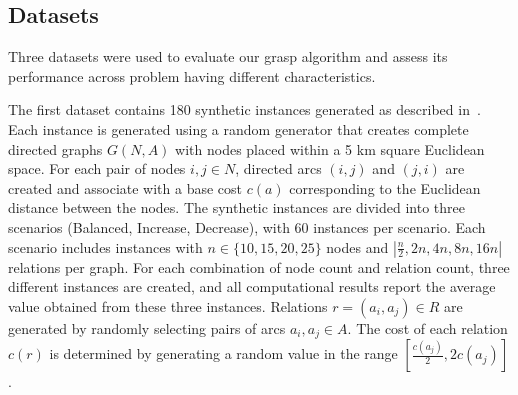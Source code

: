 \documentclass[twocolumn, switch]{article} %
\begin{document}
\subsection{Datasets}


\begin{table*}[!htpb]
    \centering
    \caption{Dataset Characteristics}
    \label{tab:dataset_characteristics}
\end{table*}

Three datasets were used to evaluate our \gls{grasp} algorithm and assess its performance across problem having different characteristics.

The first dataset contains 180 synthetic instances generated as described in~\citet{Cerrone}.
Each instance is generated using a random generator that creates complete directed graphs $G(N,A)$ 
with nodes placed within a 5 km square Euclidean space. 
For each pair of nodes $i, j \in N$, directed arcs $(i, j)$ and $(j, i)$ are created and associate with a base cost $c(a)$ 
corresponding to the Euclidean distance between the nodes. The synthetic instances are divided into three scenarios 
(Balanced, Increase, Decrease), with 60 instances per scenario. Each scenario includes instances with $n \in \{10, 15, 20, 25\}$ 
nodes and $|\frac{n}{2}, 2n, 4n, 8n, 16n|$ relations per graph. For each combination of node count and relation count, three 
different instances are created, and all computational results report the average value obtained from these three instances.
Relations $r = (a_i, a_j) \in R$ are generated by randomly selecting pairs of arcs $a_i, a_j \in A$. The cost of each relation $c(r)$ 
is determined by generating a random value in the range $[\frac{c(a_j)}{2}, 2c(a_j)]$.
\end{document}
